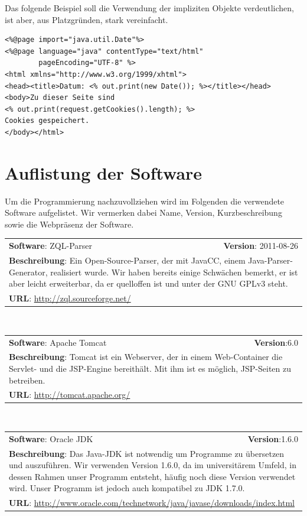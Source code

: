 Das folgende Beispiel soll die Verwendung der impliziten Objekte verdeutlichen, ist aber, aus Platzgründen, stark vereinfacht.
\lstset{language=Java}
\begin{lstlisting}
<%@page import="java.util.Date"%>
<%@page language="java" contentType="text/html" 
		pageEncoding="UTF-8" %>
<html xmlns="http://www.w3.org/1999/xhtml">
<head><title>Datum: <% out.print(new Date()); %></title></head>
<body>Zu dieser Seite sind 
<% out.print(request.getCookies().length); %> 
Cookies gespeichert.
</body></html>
\end{lstlisting}

\section{Auflistung der Software}

Um die Programmierung nachzuvollziehen wird im Folgenden die verwendete Software aufgelistet. Wir vermerken dabei Name, Version, Kurzbeschreibung sowie die Webpräsenz der Software.

\begin{tabular}{p{9cm}r}
\textbf{Software}: ZQL-Parser & \textbf{Version}: 2011-08-26\\
\multicolumn{2}{p{1\textwidth}}{\textbf{Beschreibung}: Ein Open-Source-Parser, der mit JavaCC, einem Java-Parser-Generator, realisiert wurde. Wir haben bereits einige Schwächen bemerkt, er ist aber leicht erweiterbar, da er quelloffen ist und unter der GNU GPLv3 steht.}\\
\multicolumn{2}{l}{\textbf{URL}: \url{http://zql.sourceforge.net/}}
\end{tabular}\\

\begin{tabular}{p{9cm}r}
\textbf{Software}: Apache Tomcat & \textbf{Version}:6.0\\
\multicolumn{2}{p{1\textwidth}}{\textbf{Beschreibung}: Tomcat ist ein Webserver, der in einem Web-Container die Servlet- und die JSP-Engine bereithält. Mit ihm ist es möglich, JSP-Seiten zu betreiben.}\\
\multicolumn{2}{l}{\textbf{URL}: \url{http://tomcat.apache.org/}}
\end{tabular}\\

\begin{tabular}{p{9cm}r}
\textbf{Software}: Oracle JDK  & \textbf{Version}:1.6.0\\
\multicolumn{2}{p{1\textwidth}}{\textbf{Beschreibung}: Das Java-JDK ist notwendig um Programme zu übersetzen und auszuführen. Wir verwenden Version 1.6.0, da im universitärem Umfeld, in dessen Rahmen unser Programm entsteht, häufig noch diese Version verwendet wird. Unser Programm ist jedoch auch kompatibel zu JDK 1.7.0.}\\
\multicolumn{2}{l}{\textbf{URL}: \url{http://www.oracle.com/technetwork/java/javase/downloads/index.html}}
\end{tabular}\\

